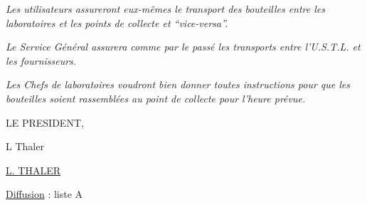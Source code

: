 \textit{Les utilisateurs assureront eux-mêmes le transport des bouteilles entre les laboratoires et les points de collecte et ``vice-versa''.}

\textit{Le Service Général assurera comme par le passé les transports entre l'U.S.T.L. et les fournisseurs.}

\textit{Les Chefs de laboratoires voudront bien donner toutes instructions pour que les bouteilles soient rassemblées au point de collecte pour l'heure prévue.}

\begin{flushright}
LE PRESIDENT,

L Thaler

\uline{L. THALER}
\end{flushright}

\uline{Diffusion} : liste A

